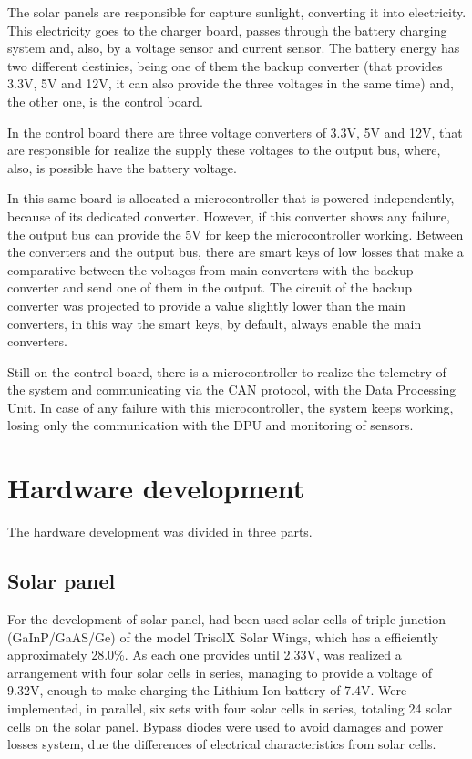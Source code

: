 \documentclass[3p]{elsarticle}
\begin{document}
	The solar panels are responsible for capture sunlight, converting it into electricity. This electricity goes to the charger board, passes through the battery charging system and, also, by a voltage sensor and current sensor. The battery energy has two different destinies, being one of them the backup converter (that provides 3.3V, 5V and 12V, it can also provide the three voltages in the same time) and, the other one, is the control board. 
	
	In the control board there are three voltage converters of 3.3V, 5V and 12V, that are responsible for realize the supply these voltages to the output bus, where, also, is possible have the battery voltage. 
	
	In this same board is allocated a microcontroller that is powered independently, because of its dedicated converter.  However, if this converter shows any failure, the output bus can provide the 5V for keep the microcontroller working. Between the converters and the output bus, there are smart keys of low losses that make a comparative between the voltages from main converters with the backup converter and send one of them in the output. The circuit of the backup converter was projected to provide a value slightly lower than the main converters, in this way the smart keys, by default, always enable the main converters.
	
	Still on the control board, there is a microcontroller to realize the telemetry of the system and communicating via the CAN protocol, with the Data Processing Unit. In case of any failure with this microcontroller, the system keeps working, losing only the communication with the DPU and monitoring of sensors.
	
\section{Hardware development}
\label{Hardware development}	

	The hardware development was divided in three parts.

\subsection{Solar panel}
\label{Solar panel}

	For the development of solar panel, had been used solar cells of triple-junction (GaInP/GaAS/Ge) of the model TrisolX Solar Wings, which has a efficiently approximately 28.0\%. As each one provides until 2.33V, was realized a arrangement with four solar cells in series, managing to provide a voltage of 9.32V, enough to make charging the Lithium-Ion battery of 7.4V. Were implemented, in parallel, six sets with four solar cells in series, totaling 24 solar cells on the solar panel. Bypass diodes were used to avoid damages and power losses system, due the differences of electrical characteristics from solar cells.\cite{TrisolX}
		
\end{document}
